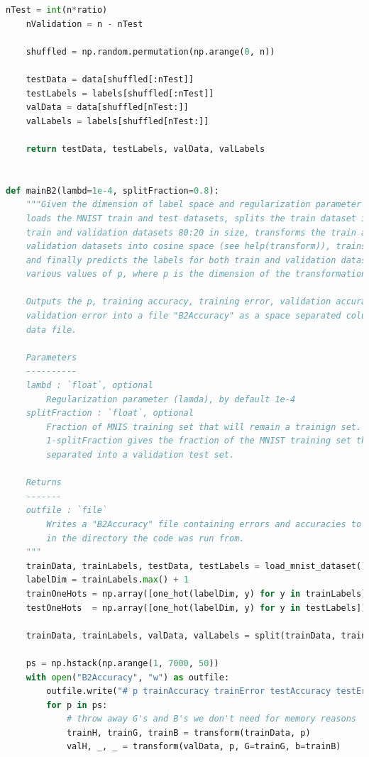 \documentclass{article}
\newcommand{\1}{\mathbf{1}}
\begin{document}
\begin{enumerate}
\begin{lstlisting}[language=Python]
    nTest = int(n*ratio)
    nValidation = n - nTest

    shuffled = np.random.permutation(np.arange(0, n))

    testData = data[shuffled[:nTest]]
    testLabels = labels[shuffled[:nTest]]
    valData = data[shuffled[nTest:]]
    valLabels = labels[shuffled[nTest:]]

    return testData, testLabels, valData, valLabels


def mainB2(lambd=1e-4, splitFraction=0.8):
    """Given the dimension of label space and regularization parameter value,
    loads the MNIST train and test datasets, splits the train dataset into the
    train and validation datasets 80:20 in size, transforms the train and
    validation datasets into cosine space (see help(transform)), trains a model,
    and finally predicts the labels for both train and validation datasets for
    various values of p, where p is the dimension of the transformation image.

    Outputs the p, training accuracy, training error, validation accuracy and
    validation error into a file "B2Accuracy" as a space separated columnar
    data file. 

    Parameters
    ----------
    lambd : `float`, optional
        Regularization parameter (lamda), by default 1e-4
    splitFraction : `float`, optional
        Fraction of MNIS training set that will remain a trainign set. The
        1-splitFraction gives the fraction of the MNIST training set that is
        separated into a validation test set.

    Returns
    -------
    outfile : `file`
        Writes a "B2Accuracy" file containing errors and accuracies to disk,
        in the directory the code was run from.
    """
    trainData, trainLabels, testData, testLabels = load_mnist_dataset()
    labelDim = trainLabels.max() + 1 
    trainOneHots = np.array([one_hot(labelDim, y) for y in trainLabels])
    testOneHots  = np.array([one_hot(labelDim, y) for y in testLabels])

    trainData, trainLabels, valData, valLabels = split(trainData, trainOneHots, splitFraction)
    
    ps = np.hstack(np.arange(1, 7000, 50))
    with open("B2Accuracy", "w") as outfile:
        outfile.write("# p trainAccuracy trainError testAccuracy testError \n")
        for p in ps:
            # throw away G's and B's we don't need for memory reasons
            trainH, trainG, trainB = transform(trainData, p)
            valH, _, _ = transform(valData, p, G=trainG, b=trainB)


\end{lstlisting}
\end{enumerate}
\end{document}
